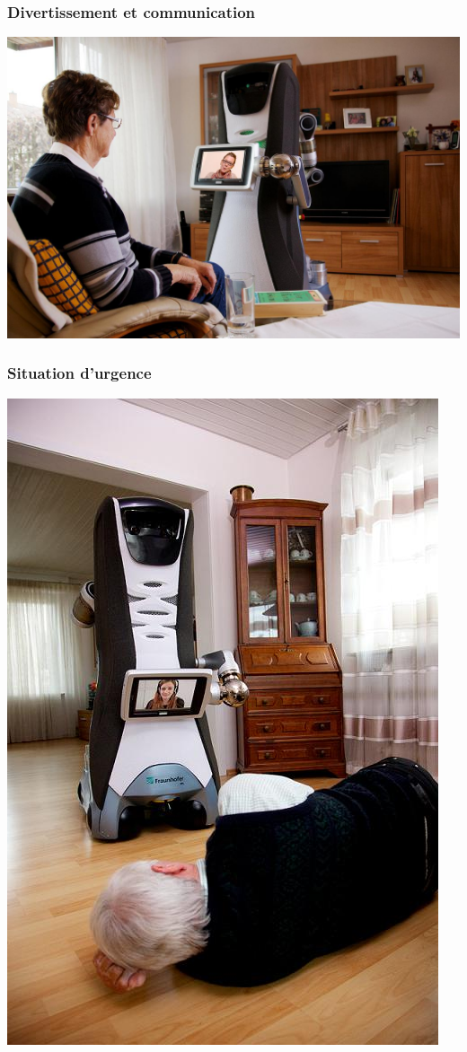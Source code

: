 \begin{frame}
	\frametitle{Divertissement et communication}
	\begin{center}
	\includegraphics[scale = 0.30]{./image/Communication.JPG}
	\end{center}
\end{frame}

\begin{frame}
	\frametitle{Situation d'urgence}
	\begin{center}
	\includegraphics[scale = 0.36]{./image/EmergencySupport.JPG}
	\end{center}
\end{frame}

